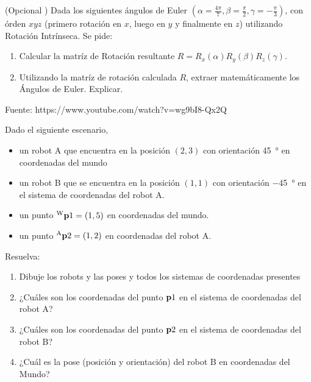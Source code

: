 \documentclass[tp]{lcc}
\begin{document}
    
\ejercicio (Opcional ) Dada los siguientes ángulos de Euler $(\alpha = \frac{4\pi}{7}, \beta = \frac{\pi}{2}, \gamma = -\frac{\pi}{3})$, con órden $xyz$ (primero rotación en $x$, luego en $y$ y finalmente en $z$) utilizando Rotación Intrínseca. Se pide:

\begin{enumerate}
    \item Calcular la matríz de Rotación resultante $R = R_{x}(\alpha) R_{y}(\beta) R_{z}(\gamma)$.
    \item Utilizando la matríz de rotación calculada $R$, extraer matemáticamente los Ángulos de Euler. Explicar.
\end{enumerate}

\begin{solucion}
    Fuente: https://www.youtube.com/watch?v=wg9bI8-Qx2Q
\end{solucion}


\ejercicio Dado el siguiente escenario,
\begin{itemize}
    \item un robot A que encuentra en la posición $(2,3)$ con orientación \SI{45}{\degree} en coordenadas del mundo
    \item un robot B que se encuentra en la posición $(1,1)$ con orientación \SI{-45}{\degree} en el sistema de coordenadas del robot A.
    \item un punto $\prescript{\mathrm{\mathrm{W}}}{}{\boldsymbol{\mathbf{p}}}1 = (1,5)$ en coordenadas del mundo.
    \item un punto $\prescript{\mathrm{A}}{}{\boldsymbol{\mathbf{p}}}2 = (1,2)$ en coordenadas del robot A.
\end{itemize}
Resuelva:
\begin{enumerate}
    \item Dibuje los robots y las poses y todos los sistemas de coordenadas presentes
    \item ¿Cuáles son los coordenadas del punto $\boldsymbol{\mathbf{p}}1$ en el sistema de coordenadas del robot A?
    \item ¿Cuáles son los coordenadas del punto $\boldsymbol{\mathbf{p}}2$ en el sistema de coordenadas del robot B?
    \item ¿Cuál es la pose (posición y orientación) del robot B en coordenadas del Mundo?
\end{enumerate}
\end{document}
